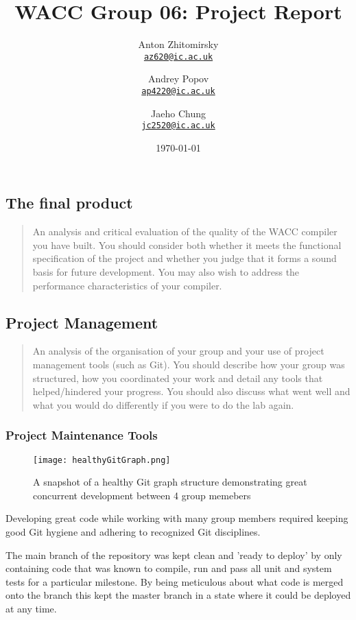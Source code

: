 \documentclass[a4paper,12pt]{article}
\title{WACC Group 06: Project Report}
\author{
    Anton Zhitomirsky \\ \texttt{\href{mailto:ps1620@ic.ac.uk}{az620@ic.ac.uk}}
    \and
    Andrey Popov \\ \texttt{\href{mailto:ap4220@ic.ac.uk}{ap4220@ic.ac.uk}}
    \and
    Jaeho Chung \\ \texttt{\href{mailto:jc2520@ic.ac.uk}{jc2520@ic.ac.uk}}
}
\date\today
\begin{document}
\sloppy

\maketitle

\subsection*{The final product}

\begin{quote}
    An analysis and critical evaluation of the quality of the WACC compiler you
have built. You should consider both whether it meets the functional specification of the project
and whether you judge that it forms a sound basis for future development. You may also wish to
address the performance characteristics of your compiler.
\end{quote}

\subsection*{Project Management}

\begin{quote}
    An analysis of the organisation of your group and your use of project
management tools (such as Git). You should describe how your group was structured, how you
coordinated your work and detail any tools that helped/hindered your progress. You should also
discuss what went well and what you would do differently if you were to do the lab again.

\end{quote}

\subsubsection*{Project Maintenance Tools}

\begin{figure}
  \texttt{[image: healthyGitGraph.png]}
  \caption{A snapshot of a healthy Git graph structure demonstrating great concurrent development between 4 group memebers}
  \label{fig:gitGraph1}
\end{figure}

Developing great code while working with many group members required keeping good Git hygiene and adhering to recognized Git disciplines.

The main branch of the repository was kept clean and 'ready to deploy' by only containing code that was known to compile, run and pass all unit and system tests for a particular milestone. By being meticulous about what code is merged onto the branch this kept the master branch in a state where it could be deployed at any time.
\end{document}
